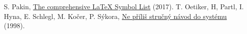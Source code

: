 \documentclass{article}
\begin{document}
	\begin{thebibliography}{99}
		 S. Pakin, \href{http://tug.ctan.org/info/symbols/comprehensive/symbols-a4.pdf}{The comprehensive \LaTeX{} Symbol List} (2017).
		 T. Oetiker, H, Partl, I. Hyna, E. Schlegl, M. Kočer, P. Sýkora,
			\href{http://www.penguin.cz/~kocer/texty/lshort2e/lshort2e-cz.pdf}{Ne příliš stručný návod do systému \LaTeXe} (1998).
	\end{thebibliography}

	\tableofcontents
\end{document}
